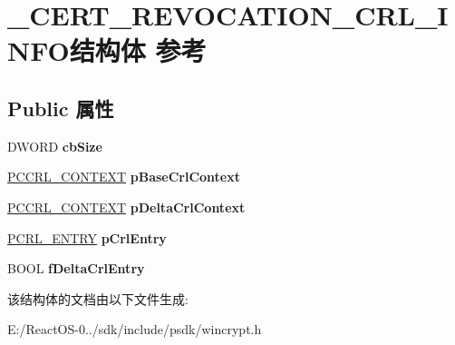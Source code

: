 \hypertarget{struct___c_e_r_t___r_e_v_o_c_a_t_i_o_n___c_r_l___i_n_f_o}{}\section{\+\_\+\+C\+E\+R\+T\+\_\+\+R\+E\+V\+O\+C\+A\+T\+I\+O\+N\+\_\+\+C\+R\+L\+\_\+\+I\+N\+F\+O结构体 参考}
\label{struct___c_e_r_t___r_e_v_o_c_a_t_i_o_n___c_r_l___i_n_f_o}
\subsection*{Public 属性}
\begin{DoxyCompactItemize}
\item 
\mbox{\label{struct___c_e_r_t___r_e_v_o_c_a_t_i_o_n___c_r_l___i_n_f_o_ad4261bce948cc3b181538099054513dd}} 
D\+W\+O\+RD {\bfseries cb\+Size}
\item 
\mbox{\label{struct___c_e_r_t___r_e_v_o_c_a_t_i_o_n___c_r_l___i_n_f_o_a6473ad19f1a0d70ae2f8620613587e90}} 
\hyperlink{struct___c_r_l___c_o_n_t_e_x_t}{P\+C\+C\+R\+L\+\_\+\+C\+O\+N\+T\+E\+XT} {\bfseries p\+Base\+Crl\+Context}
\item 
\mbox{\label{struct___c_e_r_t___r_e_v_o_c_a_t_i_o_n___c_r_l___i_n_f_o_af0c33e0ce2f0654f33c6e51e32cfbc28}} 
\hyperlink{struct___c_r_l___c_o_n_t_e_x_t}{P\+C\+C\+R\+L\+\_\+\+C\+O\+N\+T\+E\+XT} {\bfseries p\+Delta\+Crl\+Context}
\item 
\mbox{\label{struct___c_e_r_t___r_e_v_o_c_a_t_i_o_n___c_r_l___i_n_f_o_aff58a360be3add68bc7a78c7f006969b}} 
\hyperlink{struct___c_r_l___e_n_t_r_y}{P\+C\+R\+L\+\_\+\+E\+N\+T\+RY} {\bfseries p\+Crl\+Entry}
\item 
\mbox{\label{struct___c_e_r_t___r_e_v_o_c_a_t_i_o_n___c_r_l___i_n_f_o_a4bd756754a99a26157bbc076dbc97b2c}} 
B\+O\+OL {\bfseries f\+Delta\+Crl\+Entry}
\end{DoxyCompactItemize}


该结构体的文档由以下文件生成\+:\begin{DoxyCompactItemize}
\item 
E\+:/\+React\+O\+S-\/0../sdk/include/psdk/wincrypt.\+h\end{DoxyCompactItemize}
